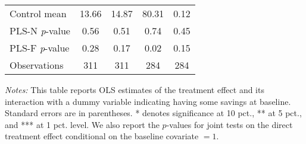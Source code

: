\begin{table}[ht]
{\begin{threeparttable}
\begin{tabular}{l*{4}{c}}
Control mean    &    13.66         &    14.87         &    80.31         &     0.12         \\
PLS-N \emph{p}-value&     0.56         &     0.51         &     0.74         &     0.45         \\
PLS-F \emph{p}-value&     0.28         &     0.17         &     0.02         &     0.15         \\
Observations    &      311         &      311         &      284         &      284         \\
\bottomrule \end{tabular} \begin{tablenotes}[flushleft] \footnotesize \item \emph{Notes:} This table reports OLS estimates of the treatment effect and its interaction with a dummy variable indicating having some savings at baseline. Standard errors are in parentheses. * denotes significance at 10 pct., ** at 5 pct., and *** at 1 pct. level. We also report the \(p\)-values for joint tests on the direct treatment effect conditional on the baseline covariate $= 1$. \end{tablenotes} \end{threeparttable} } \end{table}

